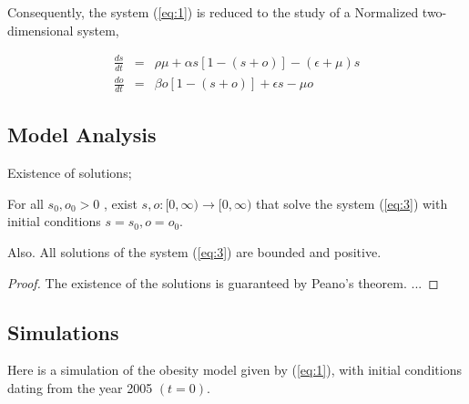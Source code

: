 	
	
		Consequently, the system (\ref{eq:1}) is reduced to the study of a Normalized two-dimensional system,
		
		\begin{equation}
			\begin{array}{ccl}
				{\displaystyle\frac{ds}{dt}}&=&\rho\mu +\alpha  s[1-(s+o)]-(\epsilon + \mu) s\\
				{\displaystyle\frac{do}{dt}}&=& \beta o[1-(s+o)]+\epsilon s-\mu o
			\end{array}
			\label{eq:3}
		\end{equation}
	
	\medskip
	\subsection{Model Analysis}
Existence of solutions;

		\begin{theorem}
			For all $s_0,o_0>0$ , exist $s,o:[0,\infty)\longrightarrow[0,\infty)$ that solve the system (\ref{eq:3}) with initial conditions $s=s_0,o= o_0$.

			 Also. All solutions of the system (\ref{eq:3}) are bounded and positive.
		\end{theorem}

		\begin{proof}
			The existence of the solutions is guaranteed by Peano's theorem.
			... \squareproof
		\end{proof}





	\subsection{Simulations}
	
	Here is a simulation of the obesity model given by (\ref{eq:1}), with initial conditions dating from the year 2005 $(t=0)$. %

	
